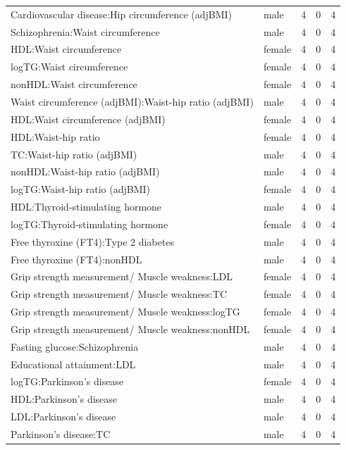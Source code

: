 \begin{table}[ht]
\begin{tabular}{llrrr}
  Cardiovascular disease:Hip circumference (adjBMI) & male &   4 &   0 &   4 \\ 
  Schizophrenia:Waist circumference & male &   4 &   0 &   4 \\ 
  HDL:Waist circumference & female &   4 &   0 &   4 \\ 
  logTG:Waist circumference & female &   4 &   0 &   4 \\ 
  nonHDL:Waist circumference & female &   4 &   0 &   4 \\ 
  Waist circumference (adjBMI):Waist-hip ratio (adjBMI) & male &   4 &   0 &   4 \\ 
  HDL:Waist circumference (adjBMI) & female &   4 &   0 &   4 \\ 
  HDL:Waist-hip ratio & female &   4 &   0 &   4 \\ 
  TC:Waist-hip ratio (adjBMI) & male &   4 &   0 &   4 \\ 
  nonHDL:Waist-hip ratio (adjBMI) & male &   4 &   0 &   4 \\ 
  logTG:Waist-hip ratio (adjBMI) & female &   4 &   0 &   4 \\ 
  HDL:Thyroid-stimulating hormone & male &   4 &   0 &   4 \\ 
  logTG:Thyroid-stimulating hormone & female &   4 &   0 &   4 \\ 
  Free thyroxine (FT4):Type 2 diabetes & male &   4 &   0 &   4 \\ 
  Free thyroxine (FT4):nonHDL & male &   4 &   0 &   4 \\ 
  Grip strength measurement/ Muscle weakness:LDL & female &   4 &   0 &   4 \\ 
  Grip strength measurement/ Muscle weakness:TC & female &   4 &   0 &   4 \\ 
  Grip strength measurement/ Muscle weakness:logTG & female &   4 &   0 &   4 \\ 
  Grip strength measurement/ Muscle weakness:nonHDL & female &   4 &   0 &   4 \\ 
  Fasting glucose:Schizophrenia & male &   4 &   0 &   4 \\ 
  Educational attainment:LDL & male &   4 &   0 &   4 \\ 
  logTG:Parkinson's disease & female &   4 &   0 &   4 \\ 
  HDL:Parkinson's disease & male &   4 &   0 &   4 \\ 
  LDL:Parkinson's disease & male &   4 &   0 &   4 \\ 
  Parkinson's disease:TC & male &   4 &   0 &   4 \\ 

\end{tabular}
\end{table}
